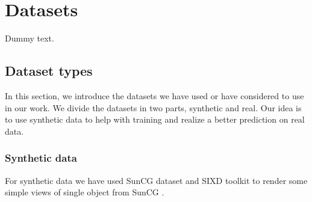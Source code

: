 \chapter{Datasets}

Dummy text.

\section{Dataset types}

In this section, we introduce the datasets we have used or have considered to use in our work. We divide the datasets in two parts, synthetic and real. Our idea is to use synthetic data to help with training and realize a better prediction on real data.

\subsection{Synthetic data}

For synthetic data we have used SunCG dataset and SIXD toolkit to render some simple views of single object from SunCG .


